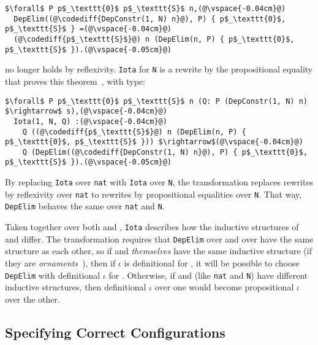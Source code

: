 \begin{lstlisting}
$\forall$ P p$_\texttt{0}$ p$_\texttt{S}$ n,(@\vspace{-0.04cm}@)
  DepElim((@\codediff{DepConstr(1, N) n}@), P) { p$_\texttt{0}$, p$_\texttt{S}$ } =(@\vspace{-0.04cm}@)
  (@\codediff{p$_\texttt{S}$}@) n (DepElim(n, P) { p$_\texttt{0}$, p$_\texttt{S}$ }).(@\vspace{-0.05cm}@)
\end{lstlisting}
no longer holds by reflexivity.
\lstinline{Iota} for \lstinline{N} is a rewrite by the propositional equality that proves this theorem~\href{https://github.com/uwplse/pumpkin-pi/blob/v2.0.0/plugin/coq/nonorn.v}{},
with type:

\begin{lstlisting}
$\forall$ P p$_\texttt{0}$ p$_\texttt{S}$ n (Q: P (DepConstr(1, N) n) $\rightarrow$ s),(@\vspace{-0.04cm}@)
  Iota(1, N, Q) :(@\vspace{-0.04cm}@)
    Q ((@\codediff{p$_\texttt{S}$}@) n (DepElim(n, P) { p$_\texttt{0}$, p$_\texttt{S}$ })) $\rightarrow$(@\vspace{-0.04cm}@)
    Q (DepElim((@\codediff{DepConstr(1, N) n}@), P) { p$_\texttt{0}$, p$_\texttt{S}$ }).(@\vspace{-0.05cm}@)
\end{lstlisting}
By replacing \lstinline{Iota} over \lstinline{nat} with \lstinline{Iota} over \lstinline{N},
the transformation replaces rewrites by reflexivity over \lstinline{nat} to rewrites by propositional equalities over \lstinline{N}.
That way, \lstinline{DepElim} behaves the same over \lstinline{nat} and \lstinline{N}.

Taken together over both \Aa and \B, \lstinline{Iota} describes how the inductive structures of \Aa and \B differ.
The transformation requires that \lstinline{DepElim} over \Aa and over \B have the same structure
as each other, so if \Aa and \B \textit{themselves} have the same 
inductive structure (if they are \textit{ornaments}~\cite{mcbride}),
then if $\iota$ is definitional for \Aa, it will be possible to choose
\lstinline{DepElim} with definitional $\iota$ for \B.
Otherwise, if \Aa and \B (like \lstinline{nat} and \lstinline{N}) have different inductive structures,
then definitional $\iota$ over one would become propositional $\iota$ over the other.

\subsection{Specifying Correct Configurations}
\label{sec:art}


